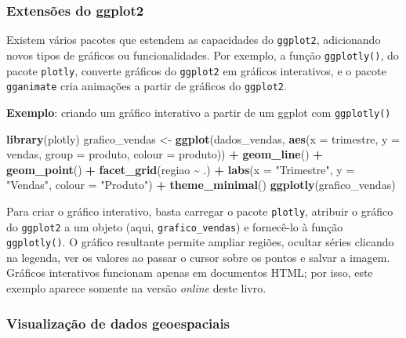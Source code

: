 \documentclass[
]{book}
\newenvironment{Shaded}{\begin{snugshade}}{\end{snugshade}}
\newcommand{\AttributeTok}[1]{\textcolor[rgb]{0.13,0.29,0.53}{#1}}
\newcommand{\FunctionTok}[1]{\textcolor[rgb]{0.13,0.29,0.53}{\textbf{#1}}}
\newcommand{\NormalTok}[1]{#1}
\newcommand{\OtherTok}[1]{\textcolor[rgb]{0.56,0.35,0.01}{#1}}
\newcommand{\SpecialCharTok}[1]{\textcolor[rgb]{0.81,0.36,0.00}{\textbf{#1}}}
\newcommand{\StringTok}[1]{\textcolor[rgb]{0.31,0.60,0.02}{#1}}
\begin{document}
\subsubsection{Extensões do ggplot2}\label{extensuxf5es-do-ggplot2}

Existem vários pacotes que estendem as capacidades do \texttt{ggplot2}, adicionando novos tipos de gráficos ou funcionalidades. Por exemplo, a função \texttt{ggplotly()}, do pacote \texttt{plotly}, converte gráficos do \texttt{ggplot2} em gráficos interativos, e o pacote \texttt{gganimate} cria animações a partir de gráficos do \texttt{ggplot2}.

\textbf{Exemplo}: criando um gráfico interativo a partir de um ggplot com \texttt{ggplotly()}

\begin{Shaded}
\begin{Highlighting}[]
\FunctionTok{library}\NormalTok{(plotly)}
\NormalTok{grafico\_vendas }\OtherTok{\textless{}{-}} \FunctionTok{ggplot}\NormalTok{(dados\_vendas, }\FunctionTok{aes}\NormalTok{(}\AttributeTok{x =}\NormalTok{ trimestre, }\AttributeTok{y =}\NormalTok{ vendas, }\AttributeTok{group =}\NormalTok{ produto,}
                                           \AttributeTok{colour =}\NormalTok{ produto)) }\SpecialCharTok{+}
  \FunctionTok{geom\_line}\NormalTok{() }\SpecialCharTok{+}
  \FunctionTok{geom\_point}\NormalTok{() }\SpecialCharTok{+}
  \FunctionTok{facet\_grid}\NormalTok{(regiao }\SpecialCharTok{\textasciitilde{}}\NormalTok{ .) }\SpecialCharTok{+}
  \FunctionTok{labs}\NormalTok{(}\AttributeTok{x =} \StringTok{"Trimestre"}\NormalTok{, }\AttributeTok{y =} \StringTok{"Vendas"}\NormalTok{, }\AttributeTok{colour =} \StringTok{"Produto"}\NormalTok{) }\SpecialCharTok{+}
  \FunctionTok{theme\_minimal}\NormalTok{()}
\FunctionTok{ggplotly}\NormalTok{(grafico\_vendas)}
\end{Highlighting}
\end{Shaded}

Para criar o gráfico interativo, basta carregar o pacote \texttt{plotly}, atribuir o gráfico do \texttt{ggplot2} a um objeto (aqui, \texttt{grafico\_vendas}) e fornecê-lo à função \texttt{ggplotly()}. O gráfico resultante permite ampliar regiões, ocultar séries clicando na legenda, ver os valores ao passar o cursor sobre os pontos e salvar a imagem. Gráficos interativos funcionam apenas em documentos HTML; por isso, este exemplo aparece somente na versão \emph{online} deste livro.

\subsubsection{Visualização de dados geoespaciais}\label{visualizauxe7uxe3o-de-dados-geoespaciais}
\end{document}
